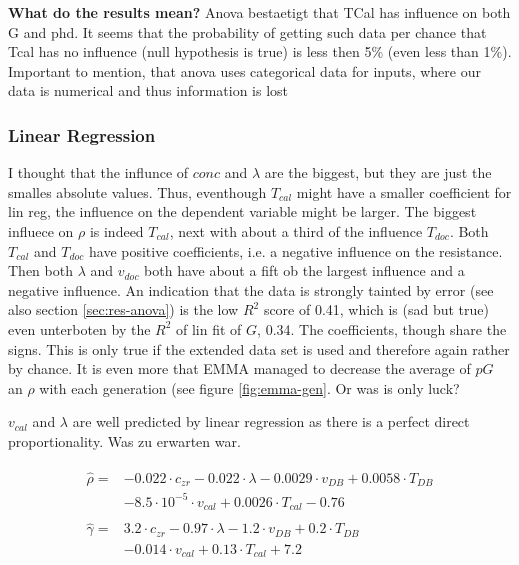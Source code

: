 \textbf{What do the results mean?} 
Anova bestaetigt that TCal has influence on both G and phd. 
It seems that the probability of getting such data per chance that Tcal has no influence 
(null hypothesis is true) is less then 5\% (even less than 1\%). 
Important to mention, that anova uses categorical data for inputs, 
where our data is numerical and thus information is lost


\subsubsection{Linear Regression}
I thought that the influnce of $conc$ and $\lambda$ are the biggest, but they are just the smalles absolute values. 
Thus, eventhough $T_{cal}$ might have a smaller coefficient for lin reg, the influence on the dependent variable might be larger. 
The biggest influece on $\rho$ is indeed $T_{cal}$, next with about a third of the influence $T_{doc}$. 
Both $T_{cal}$ and $T_{doc}$ have positive coefficients, i.e. a negative influence on the resistance. 
Then both $\lambda$ and $v_{doc}$ both have about a fift ob the largest influence and a negative influence. 
An indication that the data is strongly tainted by error (see also section \ref{sec:res-anova}) is the low $R^2$ score of 0.41, 
which is (sad but true) even unterboten by the $R^2$ of lin fit of $G$, 0.34. 
The coefficients, though share the signs. 
This is only true if the extended data set is used and therefore again rather by chance. 
It is even more  that EMMA managed to decrease the average of $pG$ an $\rho$ with each generation (see figure \ref{fig:emma-gen}. 
Or was is only luck? 

$v_{cal}$ and $\lambda$ are well predicted by linear regression as there is a perfect direct proportionality. 
Was zu erwarten war. 


\begin{align}
	\begin{split}
		\label{eq:linreg-phd}
		\hat{\rho} =&  -0.022\cdot c_{zr} -0.022\cdot \lambda -0.0029\cdot v_{DB} + 0.0058\cdot T_{DB} \\
		& -8.5\cdot 10^{-5}\cdot v_{cal} + 0.0026\cdot T_{cal} -0.76
	\end{split}
	\\
	\begin{split}
		\label{eq:linreg-G}
		\hat{\gamma} ={} & 3.2\cdot c_{zr} - 0.97\cdot \lambda - 1.2\cdot v_{DB} + 0.2\cdot T_{DB} \\
			& - 0.014\cdot v_{cal} + 0.13\cdot T_{cal} + 7.2
	\end{split}
\end{align}

